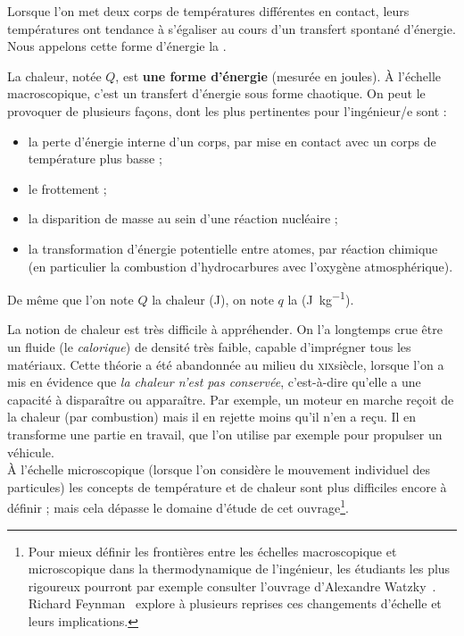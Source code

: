 		Lorsque l’on met deux corps de températures différentes en contact, leurs températures ont tendance à s’égaliser au cours d’un transfert spontané d’énergie. Nous appelons cette forme d’énergie la .

		La chaleur, notée $Q$, est \textbf{une forme d’énergie} (mesurée en \si{joules}). À l’échelle macroscopique, c’est un transfert d’énergie sous forme chaotique. On peut le provoquer de plusieurs façons, dont les plus pertinentes pour l’ingénieur/e sont :

		\begin{itemize}
		
			\item la perte d’énergie interne d’un corps, par mise en contact avec un corps de température plus basse ;

			\item le frottement ;
			
			\item la disparition de masse au sein d’une réaction nucléaire ;
			
			\item la transformation d’énergie potentielle entre atomes, par réaction chimique (en particulier la combustion d’hydrocarbures avec l’oxygène atmosphérique). 

		\end{itemize}
		
		De même que l’on note $Q$ la chaleur (\si{\joule}), on note $q$ la  (\si{\joule\per\kilogram}).
		
		La notion de chaleur est très difficile à appréhender. On l’a longtemps crue être un fluide (le \textit{calorique}) de densité très faible, capable d’imprégner tous les matériaux. Cette théorie a été abandonnée au milieu du \textsc{xix}\ieme siècle, lorsque l’on a mis en évidence que \textit{la chaleur n’est pas conservée}, c’est-à-dire qu’elle a une capacité à disparaître ou apparaître. Par exemple, un moteur en marche reçoit de la chaleur (par combustion) mais il en rejette moins qu’il n’en a reçu. Il en transforme une partie en travail, que l’on utilise par exemple pour propulser un véhicule. \\
		À l’échelle microscopique (lorsque l’on considère le mouvement individuel des particules) les concepts de température et de chaleur sont plus difficiles encore à définir ; mais cela dépasse le domaine d’étude de cet ouvrage\footnote{Pour mieux définir les frontières entre les échelles macroscopique et microscopique dans la thermodynamique de l’ingénieur, les étudiants les plus rigoureux pourront par exemple consulter l’ouvrage d’Alexandre Watzky~\cite{watzky2007}. Richard Feynman~\cite{feynman1963, feynman1963fr} explore à plusieurs reprises ces changements d’échelle et leurs implications.}\nolinebreak.


